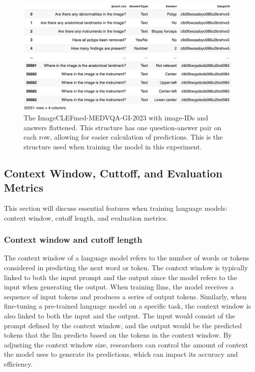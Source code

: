         \begin{figure}[htb]
            \centering
            \centerline{
            \includegraphics[width=1.2\textwidth]{images/colon_vqa_pandas_exploded.png}}
            \caption[Figure of flattened image-IDs and answers of the dataset.]{The ImageCLEFmed-MEDVQA-GI-2023 with image-IDs and answers flattened. This structure has one question-answer pair on each row, allowing for easier calculation of predictions. This is the structure used when training the model in this experiment.}
            \label{fig:colon_vqa_pandas_exploded}
        \end{figure}

        
        
    \subsection{Context Window, Cuttoff, and Evaluation Metrics}
    \label{sec:3_contex_cutoff_eval}
         This section will discuss essential features when training language models: context window, cutoff length, and evaluation metrics. 

        \subsubsection{Context window and cutoff length}
       
        The context window of a language model refers to the number of words or tokens considered in predicting the next word or token. The context window is typically linked to both the input prompt and the output since the model refers to the input when generating the output. When training \glspl{llm}, the model receives a sequence of input tokens and produces a series of output tokens. 
        Similarly, when fine-tuning a pre-trained language model on a specific task, the context window is also linked to both the input and the output. 
        The input would consist of the prompt defined by the context window, and the output would be the predicted tokens that the \gls{llm} predicts based on the tokens in the context window. 
        By adjusting the context window size, researchers can control the amount of context the model uses to generate its predictions, which can impact its accuracy and efficiency.

